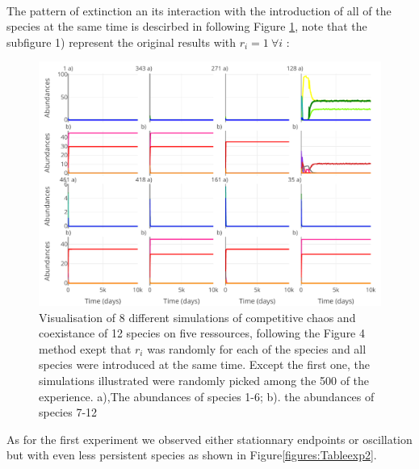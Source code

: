 \\
The pattern of extinction an its interaction with the introduction of all of the species at the same time is descirbed in following Figure \ref{figures:Figexp2}, note that the subfigure 1) represent the original results with $r_i=1 ~\forall i$ : 
\begin{figure}[H]
\begin{center} 
 \includegraphics[width=1\textwidth]{../Code/Figures/Figure_exp2.pdf}
  \caption{Visualisation of 8 different simulations of competitive chaos and coexistance of 12 species on five ressources, following the Figure 4 method exept that $r_i$ was randomly for each of the species and all species were introduced at the same time. Except the first one, the simulations illustrated were randomly picked among the 500 of the experience. a),The abundances of species 1-6; b). the abundances of species 7-12}
  \label{figures:Figexp2}
\end{center}
  \end{figure}
As for the first experiment we observed either stationnary endpoints or oscillation but with even less persistent species as shown in Figure\ref{figures:Tableexp2}.
